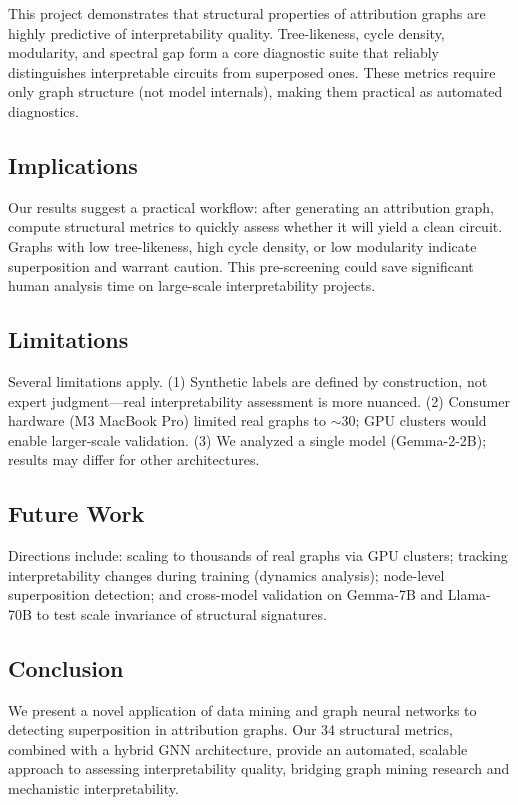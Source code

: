 \documentclass[10pt,twocolumn]{article}
\begin{document}
This project demonstrates that structural properties of attribution graphs are highly predictive of interpretability quality. Tree-likeness, cycle density, modularity, and spectral gap form a core diagnostic suite that reliably distinguishes interpretable circuits from superposed ones. These metrics require only graph structure (not model internals), making them practical as automated diagnostics.

\subsection{Implications}

Our results suggest a practical workflow: after generating an attribution graph, compute structural metrics to quickly assess whether it will yield a clean circuit. Graphs with low tree-likeness, high cycle density, or low modularity indicate superposition and warrant caution. This pre-screening could save significant human analysis time on large-scale interpretability projects.

\subsection{Limitations}

Several limitations apply. (1) Synthetic labels are defined by construction, not expert judgment---real interpretability assessment is more nuanced. (2) Consumer hardware (M3 MacBook Pro) limited real graphs to $\sim$30; GPU clusters would enable larger-scale validation. (3) We analyzed a single model (Gemma-2-2B); results may differ for other architectures.

\subsection{Future Work}

Directions include: scaling to thousands of real graphs via GPU clusters; tracking interpretability changes during training (dynamics analysis); node-level superposition detection; and cross-model validation on Gemma-7B and Llama-70B to test scale invariance of structural signatures.

\subsection{Conclusion}

We present a novel application of data mining and graph neural networks to detecting superposition in attribution graphs. Our 34 structural metrics, combined with a hybrid GNN architecture, provide an automated, scalable approach to assessing interpretability quality, bridging graph mining research and mechanistic interpretability.
\end{document}
